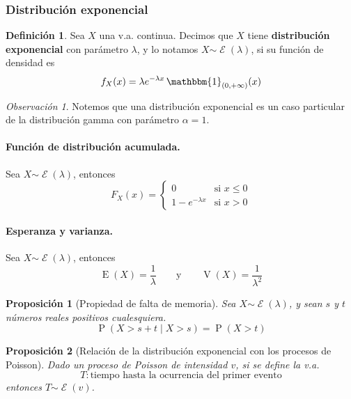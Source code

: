 \documentclass[11pt]{article}
\theoremstyle{plain}
\newtheorem*{pro}{Proposición}
\theoremstyle{definition}
\newtheorem*{defi}{Definición}
\theoremstyle{remark}
\newtheorem*{obs}{Observación}
\newcommand{\deft}[1]{\textbf{#1}}  %
\newcommand{\proba}{\ensuremath{\operatorname{P}}}  %
\newcommand{\esp}[0]{\ensuremath{\operatorname{E}}}  %
\newcommand{\var}[0]{\ensuremath{\operatorname{V}}}  %
\newcommand{\indi}[1]{\ensuremath{\mathbbm{1}_{#1}}}  %
\newcommand{\dist}[1]{\ensuremath{\sim \operatorname{#1}}}  %
\newcommand{\exponen}[0]{\ensuremath{\mathcal{E}}}  %
\begin{document}
    \subsubsection{Distribución exponencial}

      \begin{defi}
        Sea $X$ una v.a. continua. Decimos que $X$ tiene \deft{distribución exponencial} con parámetro $\lambda$, y lo notamos $X \dist{\exponen}(\lambda)$, si su función de densidad es
        \[ f_X(x) = \lambda e^{-\lambda x} \, \indi{(0,+\infty)}(x) \]
      \end{defi}

      \begin{obs}
        Notemos que una distribución exponencial es un caso particular de la distribución gamma con parámetro $\alpha = 1$.
      \end{obs}

      \paragraph{Función de distribución acumulada.}
      Sea $X \dist{\exponen}(\lambda)$, entonces
      \[ F_X(x) = \begin{cases}
        0 & \text{si $x \leq 0$} \\
        1 - e^{-\lambda x} & \text{si $x > 0$}
      \end{cases} \]

      \paragraph{Esperanza y varianza.}
      Sea $X \dist{\exponen}(\lambda)$, entonces
      \[ \esp(X) = \frac{1}{\lambda} \qquad \text{y} \qquad \var(X) = \frac{1}{\lambda^2} \]

      \begin{pro} [Propiedad de falta de memoria]
        Sea $X \dist{\exponen}(\lambda)$, y sean $s$ y $t$ números reales positivos cualesquiera.
        \[ \proba(X > s + t \mid X > s) = \proba(X > t) \]
      \end{pro}

      \begin{pro} [Relación de la distribución exponencial con los procesos de Poisson]
        Dado un proceso de Poisson de intensidad $v$, si se define la v.a.
        \[ T : \text{tiempo hasta la ocurrencia del primer evento} \]
        entonces $T \dist{\exponen}(v)$.
      \end{pro}
\end{document}
